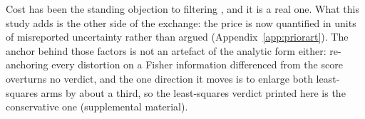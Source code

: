 Cost has been the standing objection to filtering \citep{delcore2025parameter}, and it is a real one. What this study adds is the other side of the exchange: the price is now quantified in units of misreported uncertainty rather than argued (Appendix~\ref{app:priorart}). The anchor behind those factors is not an artefact of the analytic form either: re-anchoring every distortion on a Fisher information differenced from the score overturns no verdict, and the one direction it moves is to enlarge both least-squares arms by about a third, so the least-squares verdict printed here is the conservative one (supplemental material).

